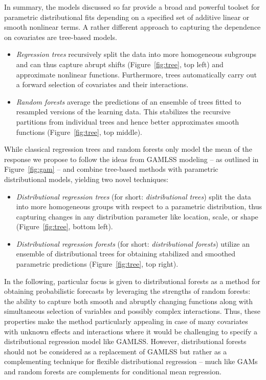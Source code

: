 \documentclass[aoas, preprint]{imsart}
\numberwithin{equation}{subsection}
\begin{document}
In summary, the models discussed so far provide a broad and powerful toolset for
parametric distributional fits depending on a specified set of additive linear or
smooth nonlinear terms. A rather different approach to capturing the dependence on
covariates are tree-based models.
\begin{itemize}
  \item \emph{Regression trees} \citep{Breiman+Friedman+Stone:1984} recursively
    split the data into more homogeneous subgroups and can thus capture abrupt shifts
    (Figure~\ref{fig:tree}, top left) and approximate nonlinear functions.
    Furthermore, trees automatically carry out a forward selection of covariates and
    their interactions. 
  \item \emph{Random forests} \citep{Breiman:2001} average the predictions of
    an ensemble of trees fitted to resampled versions of the learning data. This
    stabilizes the recursive partitions from individual trees and hence better
    approximates smooth functions (Figure~\ref{fig:tree}, top middle).
\end{itemize}
While classical regression trees and random forests only model the mean of the response
we propose to follow the ideas from GAMLSS modeling -- as outlined
in Figure~\ref{fig:gam} -- and combine tree-based methods with parametric distributional models,
yielding two novel techniques:
\begin{itemize}
  \item \emph{Distributional regression trees} (for short: \emph{distributional trees}) split the data into more homogeneous groups with
    respect to a parametric distribution, thus capturing changes in any distribution
    parameter like location, scale, or shape (Figure~\ref{fig:tree}, bottom left).
  \item \emph{Distributional regression forests} (for short: \emph{distributional forests}) utilize an ensemble of distributional trees
    for obtaining stabilized and smoothed parametric predictions (Figure~\ref{fig:tree},
    top right).
\end{itemize}

In the following, particular focus is given to distributional forests as a
method for obtaining probabilistic forecasts by leveraging the strengths of
random forests: the  ability to capture both smooth and abruptly changing
functions along with simultaneous selection of variables and possibly complex
interactions. Thus, these properties make the method particularly appealing in
case of many covariates with unknown effects and  interactions where it would be
challenging to specify a distributional regression model  like GAMLSS.
%
However, distributional forests should not be considered as a replacement
of GAMLSS but rather as a complementing technique for flexible distributional
regression -- much like GAMs and random forests are complements for conditional
mean regression.
\end{document}
